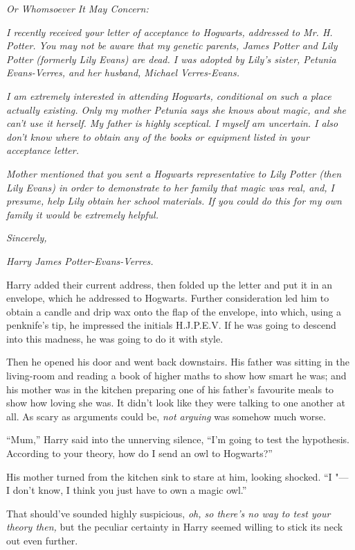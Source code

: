 \emph{Or Whomsoever It May Concern:}

\emph{I recently received your letter of acceptance to Hogwarts,
addressed to Mr. H. Potter. You may not be aware that my genetic
parents, James Potter and Lily Potter (formerly Lily Evans) are dead. I
was adopted by Lily's sister, Petunia Evans-Verres, and her husband,
Michael Verres-Evans.}

\emph{I am extremely interested in attending Hogwarts, conditional on
such a place actually existing. Only my mother Petunia says she knows
about magic, and she can't use it herself. My father is highly
sceptical. I myself am uncertain. I also don't know where to obtain any
of the books or equipment listed in your acceptance letter.}

\emph{Mother mentioned that you sent a Hogwarts representative to Lily
Potter (then Lily Evans) in order to demonstrate to her family that
magic was real, and, I presume, help Lily obtain her school materials.
If you could do this for my own family it would be extremely helpful.}

\emph{Sincerely,}

\emph{Harry James Potter-Evans-Verres.}

Harry added their current address, then folded up the letter and put it
in an envelope, which he addressed to Hogwarts. Further consideration
led him to obtain a candle and drip wax onto the flap of the envelope,
into which, using a penknife's tip, he impressed the initials H.J.P.E.V.
If he was going to descend into this madness, he was going to do it with
style.

Then he opened his door and went back downstairs. His father was sitting
in the living-room and reading a book of higher maths to show how smart
he was; and his mother was in the kitchen preparing one of his father's
favourite meals to show how loving she was. It didn't look like they
were talking to one another at all. As scary as arguments could be,
\emph{not arguing} was somehow much worse.

``Mum,'' Harry said into the unnerving silence, ``I'm going to test the
hypothesis. According to your theory, how do I send an owl to
Hogwarts?''

His mother turned from the kitchen sink to stare at him, looking
shocked. ``I "--- I don't know, I think you just have to own a magic owl.''

That should've sounded highly suspicious, \emph{oh, so there's no way to
test your theory then,} but the peculiar certainty in Harry seemed
willing to stick its neck out even further.

